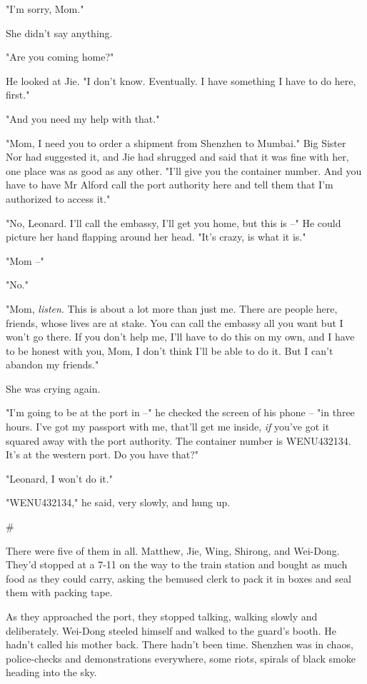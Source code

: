 "I'm sorry, Mom."

She didn't say anything.

"Are you coming home?"

He looked at Jie. "I don't know. Eventually. I have something I
have to do here, first."

"And you need my help with that."

"Mom, I need you to order a shipment from Shenzhen to Mumbai." Big
Sister Nor had suggested it, and Jie had shrugged and said that it
was fine with her, one place was as good as any other. "I'll give
you the container number. And you have to have Mr Alford call the
port authority here and tell them that I'm authorized to access
it."

"No, Leonard. I'll call the embassy, I'll get you home, but this is
--" He could picture her hand flapping around her head. "It's
crazy, is what it is."

"Mom --"

"No."

"Mom, \emph{listen}. This is about a lot more than just me. There
are people here, friends, whose lives are at stake. You can call
the embassy all you want but I won't go there. If you don't help
me, I'll have to do this on my own, and I have to be honest with
you, Mom, I don't think I'll be able to do it. But I can't abandon
my friends."

She was crying again.

"I'm going to be at the port in --" he checked the screen of his
phone -- "in three hours. I've got my passport with me, that'll get
me inside, \emph{if} you've got it squared away with the port
authority. The container number is WENU432134. It's at the western
port. Do you have that?"

"Leonard, I won't do it."

"WENU432134," he said, very slowly, and hung up.

\#

There were five of them in all. Matthew, Jie, Wing, Shirong, and
Wei-Dong. They'd stopped at a 7-11 on the way to the train station
and bought as much food as they could carry, asking the bemused
clerk to pack it in boxes and seal them with packing tape.

As they approached the port, they stopped talking, walking slowly
and deliberately. Wei-Dong steeled himself and walked to the
guard's booth. He hadn't called his mother back. There hadn't been
time. Shenzhen was in chaos, police-checks and demonstrations
everywhere, some riots, spirals of black smoke heading into the
sky.

